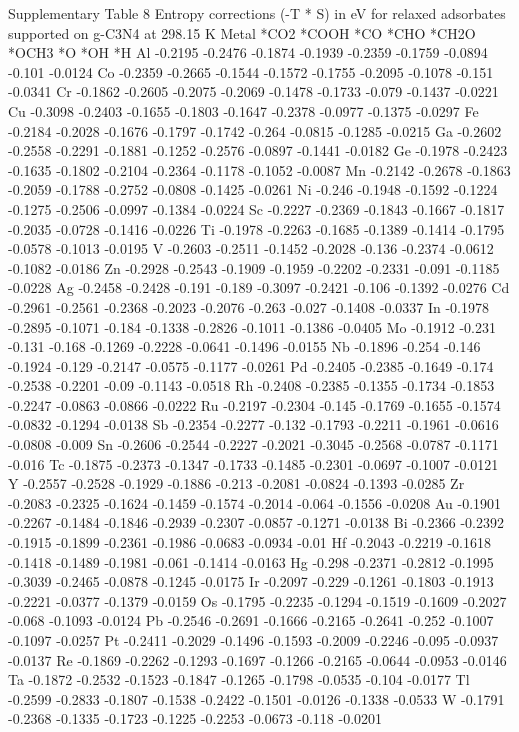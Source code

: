 Supplementary Table 8
Entropy corrections (-T * S) in eV for relaxed adsorbates supported on g-C3N4 at 298.15 K
Metal	*CO2	*COOH	*CO	*CHO	*CH2O	*OCH3	*O	*OH	*H
Al	-0.2195	-0.2476	-0.1874	-0.1939	-0.2359	-0.1759	-0.0894	-0.101	-0.0124
Co	-0.2359	-0.2665	-0.1544	-0.1572	-0.1755	-0.2095	-0.1078	-0.151	-0.0341
Cr	-0.1862	-0.2605	-0.2075	-0.2069	-0.1478	-0.1733	-0.079	-0.1437	-0.0221
Cu	-0.3098	-0.2403	-0.1655	-0.1803	-0.1647	-0.2378	-0.0977	-0.1375	-0.0297
Fe	-0.2184	-0.2028	-0.1676	-0.1797	-0.1742	-0.264	-0.0815	-0.1285	-0.0215
Ga	-0.2602	-0.2558	-0.2291	-0.1881	-0.1252	-0.2576	-0.0897	-0.1441	-0.0182
Ge	-0.1978	-0.2423	-0.1635	-0.1802	-0.2104	-0.2364	-0.1178	-0.1052	-0.0087
Mn	-0.2142	-0.2678	-0.1863	-0.2059	-0.1788	-0.2752	-0.0808	-0.1425	-0.0261
Ni	-0.246	-0.1948	-0.1592	-0.1224	-0.1275	-0.2506	-0.0997	-0.1384	-0.0224
Sc	-0.2227	-0.2369	-0.1843	-0.1667	-0.1817	-0.2035	-0.0728	-0.1416	-0.0226
Ti	-0.1978	-0.2263	-0.1685	-0.1389	-0.1414	-0.1795	-0.0578	-0.1013	-0.0195
V	-0.2603	-0.2511	-0.1452	-0.2028	-0.136	-0.2374	-0.0612	-0.1082	-0.0186
Zn	-0.2928	-0.2543	-0.1909	-0.1959	-0.2202	-0.2331	-0.091	-0.1185	-0.0228
Ag	-0.2458	-0.2428	-0.191	-0.189	-0.3097	-0.2421	-0.106	-0.1392	-0.0276
Cd	-0.2961	-0.2561	-0.2368	-0.2023	-0.2076	-0.263	-0.027	-0.1408	-0.0337
In	-0.1978	-0.2895	-0.1071	-0.184	-0.1338	-0.2826	-0.1011	-0.1386	-0.0405
Mo	-0.1912	-0.231	-0.131	-0.168	-0.1269	-0.2228	-0.0641	-0.1496	-0.0155
Nb	-0.1896	-0.254	-0.146	-0.1924	-0.129	-0.2147	-0.0575	-0.1177	-0.0261
Pd	-0.2405	-0.2385	-0.1649	-0.174	-0.2538	-0.2201	-0.09	-0.1143	-0.0518
Rh	-0.2408	-0.2385	-0.1355	-0.1734	-0.1853	-0.2247	-0.0863	-0.0866	-0.0222
Ru	-0.2197	-0.2304	-0.145	-0.1769	-0.1655	-0.1574	-0.0832	-0.1294	-0.0138
Sb	-0.2354	-0.2277	-0.132	-0.1793	-0.2211	-0.1961	-0.0616	-0.0808	-0.009
Sn	-0.2606	-0.2544	-0.2227	-0.2021	-0.3045	-0.2568	-0.0787	-0.1171	-0.016
Tc	-0.1875	-0.2373	-0.1347	-0.1733	-0.1485	-0.2301	-0.0697	-0.1007	-0.0121
Y	-0.2557	-0.2528	-0.1929	-0.1886	-0.213	-0.2081	-0.0824	-0.1393	-0.0285
Zr	-0.2083	-0.2325	-0.1624	-0.1459	-0.1574	-0.2014	-0.064	-0.1556	-0.0208
Au	-0.1901	-0.2267	-0.1484	-0.1846	-0.2939	-0.2307	-0.0857	-0.1271	-0.0138
Bi	-0.2366	-0.2392	-0.1915	-0.1899	-0.2361	-0.1986	-0.0683	-0.0934	-0.01
Hf	-0.2043	-0.2219	-0.1618	-0.1418	-0.1489	-0.1981	-0.061	-0.1414	-0.0163
Hg	-0.298	-0.2371	-0.2812	-0.1995	-0.3039	-0.2465	-0.0878	-0.1245	-0.0175
Ir	-0.2097	-0.229	-0.1261	-0.1803	-0.1913	-0.2221	-0.0377	-0.1379	-0.0159
Os	-0.1795	-0.2235	-0.1294	-0.1519	-0.1609	-0.2027	-0.068	-0.1093	-0.0124
Pb	-0.2546	-0.2691	-0.1666	-0.2165	-0.2641	-0.252	-0.1007	-0.1097	-0.0257
Pt	-0.2411	-0.2029	-0.1496	-0.1593	-0.2009	-0.2246	-0.095	-0.0937	-0.0137
Re	-0.1869	-0.2262	-0.1293	-0.1697	-0.1266	-0.2165	-0.0644	-0.0953	-0.0146
Ta	-0.1872	-0.2532	-0.1523	-0.1847	-0.1265	-0.1798	-0.0535	-0.104	-0.0177
Tl	-0.2599	-0.2833	-0.1807	-0.1538	-0.2422	-0.1501	-0.0126	-0.1338	-0.0533
W	-0.1791	-0.2368	-0.1335	-0.1723	-0.1225	-0.2253	-0.0673	-0.118	-0.0201

